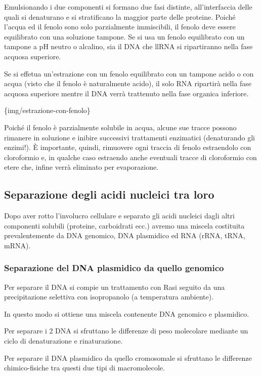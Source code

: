 \documentclass[11pt]{book}
\begin{document}
Emulsionando i due componenti si formano due fasi distinte,
all'interfaccia delle quali si denaturano e si stratificano la maggior
parte delle proteine. Poiché l'acqua ed il fenolo sono solo parzialmente
immiscibili, il fenolo deve essere equilibrato con una soluzione
tampone. Se si usa un fenolo equilibrato con un tampone a pH neutro o
alcalino, sia il DNA che llRNA si ripartiranno nella fase acquosa
superiore.

Se si effetua un'estrazione con un fenolo equilibrato con un tampone
acido o con acqua (visto che il fenolo è naturalmente acido), il solo
RNA ripartirà nella fase acquosa superiore mentre il DNA verrà
trattenuto nella fase organica inferiore.

\{img/estrazione-con-fenolo\}

Poiché il fenolo è parzialmente solubile in acqua, alcune sue tracce
possono rimanere in soluzione e inibire successivi trattamenti
enzimatici (denaturando gli enzimi!). È importante, quindi, rimuovere
ogni traccia di fenolo estraendolo con cloroformio e, in qualche caso
estraendo anche eventuali tracce di cloroformio con etere che, infine
verrà eliminato per evaporazione.

\subsection{Separazione degli acidi nucleici tra
loro}\label{separazione-degli-acidi-nucleici-tra-loro}

Dopo aver rotto l'involucro cellulare e separato gli acidi nucleici
dagli altri componenti solubili (proteine, carboidrati ecc.) avremo una
miscela costituita prevalentemente da DNA genomico, DNA plasmidico ed
RNA (rRNA, tRNA, mRNA).

\subsubsection{Separazione del DNA plasmidico da quello
genomico}\label{separazione-del-dna-plasmidico-da-quello-genomico}

Per separare il DNA si compie un trattamento con Rasi seguito da una
precipitazione selettiva con isopropanolo (a temperatura ambiente).

In questo modo si ottiene una miscela contenente DNA genomico e
plasmidico.

Per separare i 2 DNA si sfruttano le differenze di peso molecolare
mediante un ciclo di denaturazione e rinaturazione.

Per separare il DNA plasmidico da quello cromosomale si sfruttano le
differenze chimico-fisiche tra questi due tipi di macromolecole.
\end{document}
